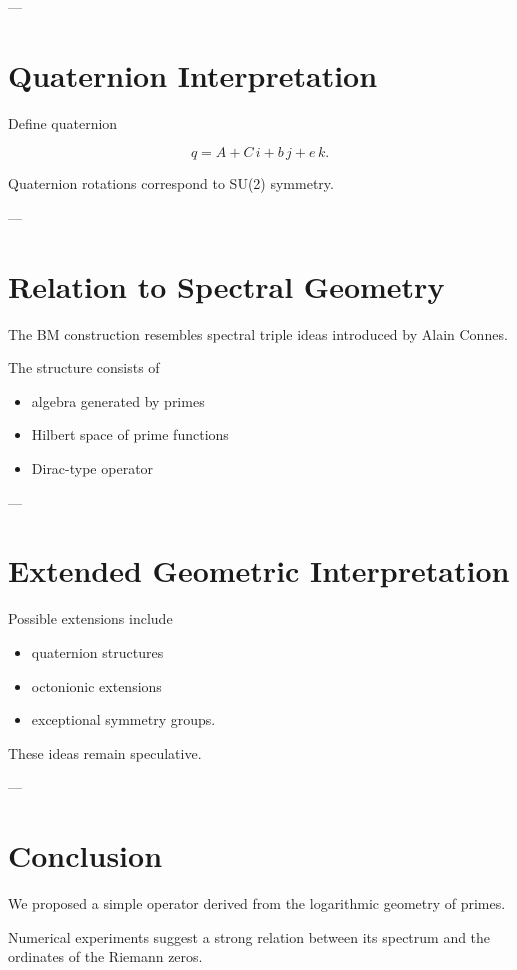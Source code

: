 \documentclass[11pt,a4paper]{article}
\begin{document}
	---
	
	\section{Quaternion Interpretation}
	
	Define quaternion
	
	\[
	q=A+C\,i+b\,j+e\,k.
	\]
	
	Quaternion rotations correspond to SU(2) symmetry.
	
	---
	
	\section{Relation to Spectral Geometry}
	
	The BM construction resembles spectral triple ideas introduced by Alain Connes.
	
	The structure consists of
	
	\begin{itemize}
		\item algebra generated by primes
		\item Hilbert space of prime functions
		\item Dirac-type operator
	\end{itemize}
	
	---
	
	\section{Extended Geometric Interpretation}
	
	Possible extensions include
	
	\begin{itemize}
		\item quaternion structures
		\item octonionic extensions
		\item exceptional symmetry groups.
	\end{itemize}
	
	These ideas remain speculative.
	
	---
	
	\section{Conclusion}
	
	We proposed a simple operator derived from
	the logarithmic geometry of primes.
	
	Numerical experiments suggest a strong relation between
	its spectrum and the ordinates of the Riemann zeros.
	
\end{document}
